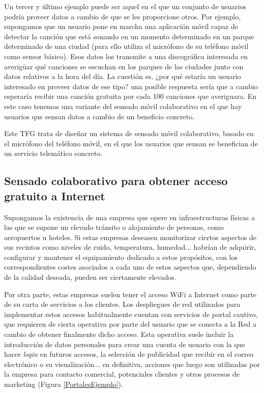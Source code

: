Un tercer y último ejemplo puede ser aquel en el que un conjunto de usuarios podría proveer datos a cambio de que se les proporcione otros. Por ejemplo, supongamos que un usuario pone en marcha una aplicación móvil capaz de detectar la canción que está sonando en un momento determinado en un parque determinado de una ciudad (para ello utiliza el micrófono de su teléfono móvil como sensor básico). Esos datos los transmite a una discográfica interesada en averigüar qué canciones se escuchan en los parques de las ciudades junto con datos relativos a la hora del día. La cuestión es, ¿por qué estaría un usuario interesado en proveer datos de ese tipo? una posible respuesta sería que a cambio esperaría recibir una canción gratuita por cada 100 canciones que averiguara. En este caso tenemos una variante del sensado móvil colaborativo en el que hay usuarios que sensan datos a cambio de un beneficio concreto.

Este TFG trata de diseñar un sistema de sensado móvil colaborativo, basado en el micrófono del teléfono móvil, en el que los usuarios que sensan se benefician de un servicio telemático concreto.

\subsection{Sensado colaborativo para obtener acceso gratuito a Internet}

Supongamos la existencia de una empresa que opere en infraestructuras físicas a las que se supone un elevado tránsito o alojamiento de personas, como aeropuertos u hoteles. Si estas empresas deseasen monitorizar ciertos aspectos de sus recintos como niveles de ruido, temperatura, humedad... habrían de adquirir, configurar y mantener el equipamiento dedicado a estos propósitos, con los correspondientes costes asociados a cada uno de estos aspectos que, dependiendo de la calidad deseada, pueden ser ciertamente elevados.

Por otra parte, estas empresas suelen tener el acceso WiFi a Internet como parte de su carta de servicios a los clientes. Los despliegues de red utilizados para implementar estos accesos habitualmente cuentan con servicios de portal cautivo, que requieren de cierta operativa por parte del usuario que se conecta a la Red a cambio de obtener finalmente dicho acceso. Esta operativa suele incluir la introducción de datos personales para crear una cuenta de usuario con la que hacer \emph{login} en futuros accesos, la selección de publicidad que recibir en el correo electrónico o su visualización... en definitiva, acciones que luego son utilizadas por la empresa para contacto comercial, potenciales clientes y otros procesos de marketing (Figura \ref{PortalesEjemplo}).

